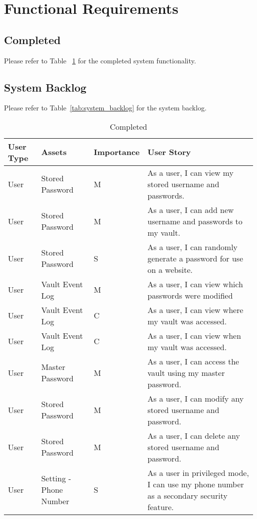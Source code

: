 \documentclass{article}
\begin{document}
\section{Functional Requirements}
\label{sec:functional_requirements}

\subsection{Completed}
\label{sub:completed}
Please refer to Table ~\ref{tab:completed} for the completed system functionality.

\subsection{System Backlog}
\label{sub:system_backlog}
Please refer to Table~\ref{tab:system_backlog} for the system backlog.

\begin{table}[H]
  \centering
  {
    \renewcommand\arraystretch{1.25}
    \begin{tabular}{>{\centering}m{1cm} >{\centering}m{4cm} >{\centering}m{2cm} >{\centering\arraybackslash}m{8cm} }
    \toprule
    User Type & Assets & Importance & User Story \\
    \midrule
    User & Stored Password & M & As a user, I can view my stored username and passwords. \\
    User & Stored Password & M & As a user, I can add new username and passwords to my vault. \\
    User & Stored Password & S & As a user, I can randomly generate a password for use on a website. \\
    User & Vault Event Log & M & As a user, I can view which passwords were modified \\
    User & Vault Event Log & C & As a user, I can view where my vault was accessed. \\
    User & Vault Event Log & C & As a user, I can view when my vault was accessed. \\
    User & Master Password & M & As a user, I can access the vault using my master password. \\
    User & Stored Password & M & As a user, I can modify any stored username and password. \\
    User & Stored Password & M & As a user, I can delete any stored username and password. \\
    User & Setting - Phone Number & S & As a user in privileged mode, I can use my phone number as a secondary security feature. \\
    \bottomrule
    \end{tabular}
  }
  \caption{Completed}
  \label{tab:completed}
\end{table}
\newpage
\end{document}
